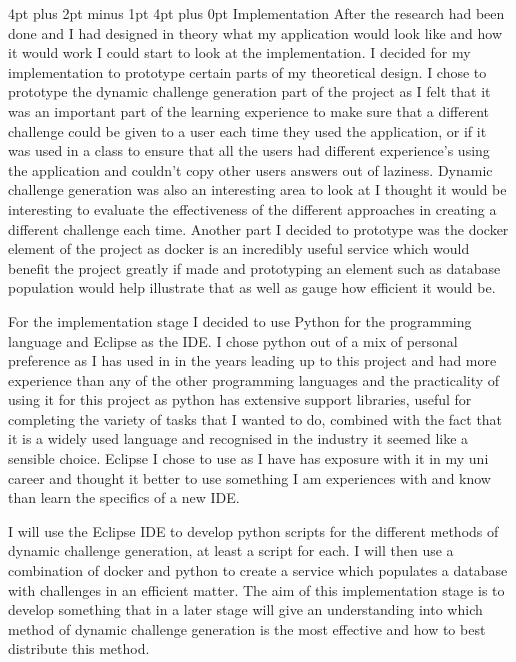 \documentclass[12pt,a4paper]{article}
\makeatletter
\renewcommand\section{\@startsection {section}{1}{0mm} %
                               {4pt plus 2pt minus 1pt} %
                               {4pt plus 0pt} %
                               {\bfseries}}
\makeatother
\begin{document}

\section{Implementation}
After the research had been done and I had designed in theory what my application would look like and how it would work I could start to look at the implementation. I decided for my implementation to prototype certain parts of my theoretical design. I chose to prototype the dynamic challenge generation part of the project as I felt that it was an important part of the learning experience to make sure that a different challenge could be given to a user each time they used the application, or if it was used in a class to ensure that all the users had different experience's using the application and couldn't copy other users answers out of laziness. Dynamic challenge generation was also an interesting area to look at I thought it would be interesting to evaluate the effectiveness of the different approaches in creating a different challenge each time. Another part I decided to prototype was the docker element of the project as docker is an incredibly useful service which would benefit the project greatly if made and prototyping an element such as database population would help illustrate that as well as gauge how efficient it would be.  

For the implementation stage I decided to use Python for the programming language and Eclipse as the IDE. I chose python out of a mix of personal preference as I has used in in the years leading up to this project and had more experience than any of the other programming languages and the practicality of using it for this project as python has extensive support libraries, useful for completing the variety of tasks that I wanted to do, combined with the fact that it is a widely used language and recognised in the industry it seemed like a sensible choice. Eclipse I chose to use as I have has exposure with it in my uni career and thought it better to use something I am experiences with and know than learn the specifics of a new IDE.

I will use the Eclipse IDE to develop python scripts for the different methods of dynamic challenge generation, at least a script for each. I will then use a combination of docker and python to create a service which populates a database with challenges in an efficient matter. The aim of this implementation stage is to develop something that in a later stage will give an understanding into which method of dynamic challenge generation is the most effective and how to best distribute this method.  
\end{document}
